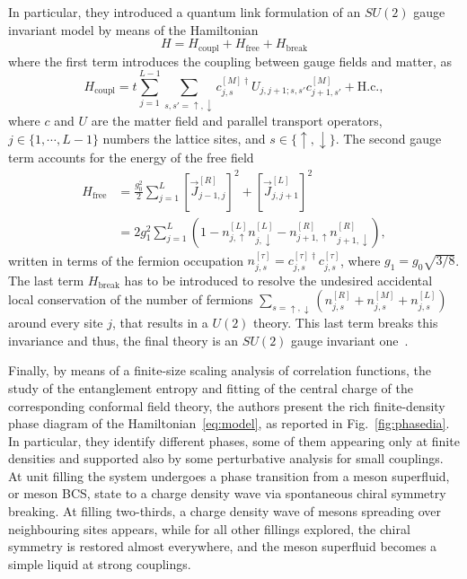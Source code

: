 \documentclass[epj,final]{svjour}
\begin{document}
In particular, they introduced a quantum link formulation of an $SU(2)$ gauge invariant model by means of the Hamiltonian
\begin{equation} 
\label{eq:model}
H =  H_{\mathrm{coupl}} + H_{\mathrm{free}} + H_{\mathrm{break}}
\end{equation}
where the first term introduces the coupling between gauge fields and matter, as
\begin{equation}
 H_{\mathrm{coupl}} = t \sum_{j = 1}^{L-1} \sum_{s,s' = \uparrow, \downarrow} c^{[M] \dagger}_{j,s}
 U_{j,j+1;s,s'} c^{[M]}_{j+1,s'} + \mbox{H.c.},
\end{equation}
where $c$ and $U$ are the matter field and parallel transport operators, $j \in \{1, \cdots ,L-1\}$ numbers the lattice sites, and $s \in \{\uparrow, \downarrow\}$. The second gauge term accounts for the energy of the free field
\begin{equation}
\begin{split}
 H_{\mathrm{free}} &= \frac{g_0^2}{2} \sum_{j = 1}^{L}  \left[ \vec{J}^{[R]}_{j-1,j} \right]^2 + \left[ \vec{J}^{[L]}_{j,j+1} \right]^2 \\
 & = 2 g_1^2
 \sum_{j = 1}^{L} \left( 1 - n^{[L]}_{j,\uparrow} n^{[L]}_{j,\downarrow} - n^{[R]}_{j+1,\uparrow} n^{[R]}_{j+1,\downarrow} \right),
\end{split}
\end{equation}
written in terms of the fermion occupation $n^{[\tau]}_{j,s} = c^{[\tau] \dagger}_{j,s} c^{[\tau]}_{j,s}$, where $g_1 = g_0 \sqrt{3/8}$. The last term $H_{\mathrm{break}}$ has to be introduced to resolve the undesired accidental local conservation of the number of fermions $\sum_{s = \uparrow, \downarrow} \left( n^{[R]}_{j,s} + n^{[M]}_{j,s} + n^{[L]}_{j,s} \right)$ around every site $j$, that results in a $U(2)$ theory. This last term breaks this invariance and thus, the final theory is an $SU(2)$ gauge invariant one~\cite{silvi2017finite}. 

Finally, by means of a finite-size scaling analysis of correlation functions, the study of the entanglement  entropy and fitting of the central charge of the corresponding conformal field theory, the authors present the rich finite-density phase diagram of the Hamiltonian~\eqref{eq:model}, as reported in Fig.~\ref{fig:phasedia}. In particular, they identify different phases, some of them appearing only at finite densities and supported also by some perturbative analysis for small couplings. At unit filling the system undergoes a phase transition from a meson superfluid, or meson BCS, state to a charge density wave via spontaneous chiral symmetry breaking. At filling two-thirds, a charge density wave of mesons spreading over neighbouring sites appears, while for all other fillings explored, the chiral symmetry is restored almost everywhere, and the meson superfluid becomes a simple liquid at strong couplings.
\end{document}
